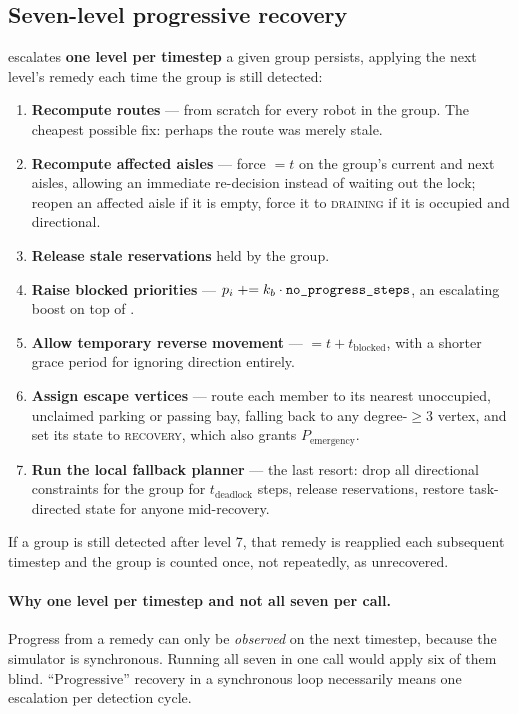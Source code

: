 \subsection{Seven-level progressive recovery}
\label{sec:recovery-levels}

 escalates \textbf{one level per timestep} a
given group persists, applying the next level's remedy each time the group is
still detected:

\begin{enumerate}
\item \textbf{Recompute routes} --- from scratch for every robot in the group.
  The cheapest possible fix: perhaps the route was merely stale.
\item \textbf{Recompute affected aisles} --- force  $= t$ on
  the group's current and next aisles, allowing an immediate re-decision
  instead of waiting out the lock; reopen an affected aisle if it is empty,
  force it to \textsc{draining} if it is occupied and directional.
\item \textbf{Release stale reservations} held by the group.
\item \textbf{Raise blocked priorities} ---
  $p_i \mathrel{+}= k_b \cdot \texttt{no\_progress\_steps}$, an escalating boost
  on top of .
\item \textbf{Allow temporary reverse movement} ---
   $= t + t_{\mathrm{blocked}}$, with a shorter
  grace period for ignoring direction entirely.
\item \textbf{Assign escape vertices} --- route each member to its nearest
  unoccupied, unclaimed parking or passing bay, falling back to any
  degree-$\geq 3$ vertex, and set its state to \textsc{recovery}, which also
  grants $P_{\mathrm{emergency}}$.
\item \textbf{Run the local fallback planner} --- the last resort: drop all
  directional constraints for the group for $t_{\mathrm{deadlock}}$ steps,
  release reservations, restore task-directed state for anyone mid-recovery.
\end{enumerate}

If a group is still detected after level 7, that remedy is reapplied each
subsequent timestep and the group is counted once, not repeatedly, as
unrecovered.

\paragraph{Why one level per timestep and not all seven per call.} Progress
from a remedy can only be \emph{observed} on the next timestep, because the
simulator is synchronous. Running all seven in one call would apply six of them
blind. ``Progressive'' recovery in a synchronous loop necessarily means one
escalation per detection cycle.
